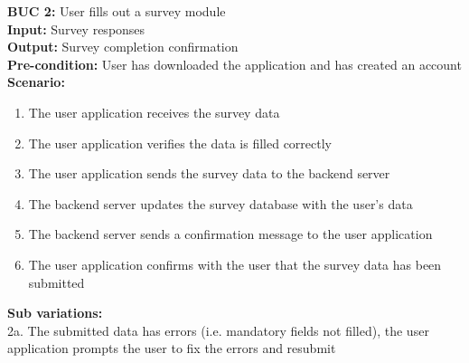 \documentclass[12pt]{article}
\begin{document}
\noindent\textbf{BUC 2: } User fills out a survey module \\
\textbf{Input:} Survey responses \\
\textbf{Output:} Survey completion confirmation \\
\textbf{Pre-condition:} User has downloaded the application and has created an account \\
\textbf{Scenario:} \\
\begin{enumerate}
  \item The user application receives the survey data
  \item The user application verifies the data is filled correctly
  \item The user application sends the survey data to the backend server
  \item The backend server updates the survey database with the user’s data
  \item The backend server sends a confirmation message to the user application
  \item The user application confirms with the user that the survey data has been submitted
\end{enumerate}
\textbf{Sub variations:} \\
2a. The submitted data has errors (i.e. mandatory fields not filled), the user application prompts the user to fix the errors and resubmit \\
\end{document}

